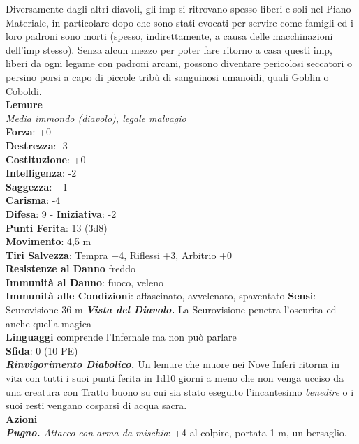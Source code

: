 \begin{multicols}{2}
Diversamente dagli altri diavoli, gli imp si ritrovano spesso liberi e soli nel Piano Materiale, in particolare dopo che sono stati evocati per servire come famigli ed i loro padroni sono morti (spesso, indirettamente, a causa delle macchinazioni dell'imp stesso). Senza alcun mezzo per poter fare ritorno a casa questi imp, liberi da ogni legame con padroni arcani, possono diventare pericolosi seccatori o persino porsi a capo di piccole tribù di sanguinosi umanoidi, quali Goblin o Coboldi.\\


\medskip\textbf{Lemure}\\
\emph{Media immondo (diavolo), legale malvagio}\\
\textbf{Forza}: +0\\
\textbf{Destrezza}: -3\\
\textbf{Costituzione}: +0\\
\textbf{Intelligenza}: -2\\
\textbf{Saggezza}: +1\\
\textbf{Carisma}: -4\\
\textbf{Difesa}: 9 - \textbf{Iniziativa}: -2\\
\textbf{Punti Ferita}: 13 (3d8)\\
\textbf{Movimento}: 4,5 m\\
\textbf{Tiri Salvezza}: Tempra +4, Riflessi +3, Arbitrio +0\\
\textbf{Resistenze al Danno} freddo\\
\textbf{Immunità al Danno}: fuoco, veleno\\
\textbf{Immunità alle Condizioni}: affascinato, avvelenato, spaventato
\textbf{Sensi}: Scurovisione 36 m
\emph{\textbf{Vista del Diavolo.}} La Scurovisione penetra l'oscurita ed anche quella magica\\
\textbf{Linguaggi} comprende l'Infernale ma non può parlare\\
\textbf{Sfida}: 0 (10 PE)\smallskip\\
\emph{\textbf{Rinvigorimento Diabolico.}} Un lemure che muore nei Nove Inferi ritorna in vita con tutti i suoi punti ferita in 1d10 giorni a meno che non venga ucciso da una creatura con Tratto buono su cui sia stato eseguito l'incantesimo \emph{benedire} o i suoi resti vengano cosparsi di acqua sacra.\\
\smallskip\textbf{Azioni} \\
\emph{\textbf{Pugno.} Attacco con arma da mischia}: +4 al colpire, portata 1 m, un bersaglio.\\

\end{multicols}
